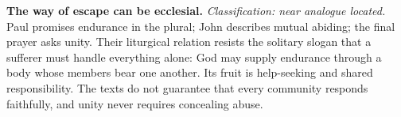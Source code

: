 \noindent\textbf{The way of escape can be ecclesial.\enspace{}}
\emph{Classification: near analogue located.} Paul promises endurance in the plural; John describes mutual abiding; the final prayer asks unity. Their liturgical relation resists the solitary slogan that a sufferer must handle everything alone: God may supply endurance through a body whose members bear one another. Its fruit is help-seeking and shared responsibility. The texts do not guarantee that every community responds faithfully, and unity never requires concealing abuse.
